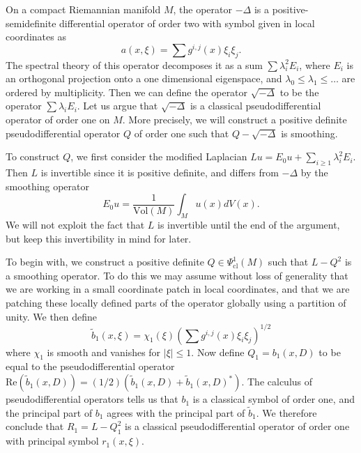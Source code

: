 \begin{example}
    On a compact Riemannian manifold $M$, the operator $- \Delta$ is a positive-semidefinite differential operator of order two with symbol given in local coordinates as
    \[ a(x,\xi) = \sum g^{i,j}(x) \xi_i \xi_j. \]
    The spectral theory of this operator decomposes it as a sum $\sum \lambda_i^2 E_i$, where $E_i$ is an orthogonal projection onto a one dimensional eigenspace, and $\lambda_0 \leq \lambda_1 \leq \dots$ are ordered by multiplicity. Then we can define the operator $\sqrt{-\Delta}$ to be the operator $\sum \lambda_i E_i$. Let us argue that $\sqrt{-\Delta}$ is a classical pseudodifferential operator of order one on $M$. More precisely, we will construct a positive definite pseudodifferential operator $Q$ of order one such that $Q - \sqrt{-\Delta}$ is smoothing.

    To construct $Q$, we first consider the modified Laplacian $Lu = E_0u + \sum_{i \geq 1} \lambda_i^2 E_i$. Then $L$ is invertible since it is positive definite, and differs from $- \Delta$ by the smoothing operator
    \[ E_0 u = \frac{1}{\text{Vol}(M)} \int_M u(x) dV(x). \]
    We will not exploit the fact that $L$ is invertible until the end of the argument, but keep this invertibility in mind for later.

    To begin with, we construct a positive definite $Q \in \Psi_{\text{cl}}^1(M)$ such that $L - Q^2$ is a smoothing operator. To do this we may assume without loss of generality that we are working in a small coordinate patch in local coordinates, and that we are patching these locally defined parts of the operator globally using a partition of unity. We then define
    \[ \tilde{b}_1(x,\xi) = \chi_1(\xi) \left( \sum g^{i,j}(x) \xi_i \xi_j \right)^{1/2} \]
    where $\chi_1$ is smooth and vanishes for $|\xi| \leq 1$. Now define $Q_1 = b_1(x,D)$ to be equal to the pseudodifferential operator $\text{Re}(\tilde{b}_1(x,D)) = (1/2)(\tilde{b}_1(x,D) + \tilde{b}_1(x,D)^*)$. The calculus of pseudodifferential operators tells us that $b_1$ is a classical symbol of order one, and the principal part of $b_1$ agrees with the principal part of $\tilde{b}_1$. We therefore conclude that $R_1 = L - Q_1^2$ is a classical pseudodifferential operator of order one with principal symbol $r_1(x,\xi)$.


\end{example}
